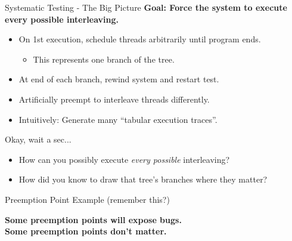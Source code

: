 \documentclass[xcolor=dvipsnames]{beamer}
\begin{document}

\begin{frame}{Systematic Testing - The Big Picture}
	\textbf{Goal: Force the system to execute every possible interleaving.}
	\begin{itemize}
		\item On 1st execution, schedule threads arbitrarily until program ends.
			\begin{itemize}
				\item This represents one branch of the tree.
			\end{itemize}
		\item At end of each branch, rewind system and restart test.
		\item Artificially preempt to interleave threads differently.
		\item Intuitively: Generate many ``tabular execution traces''.
	\end{itemize}
	\pause
	\linegap

	Okay, wait a sec...
	\begin{itemize}
		\item How can you possibly execute {\em every possible} interleaving?
		\item How did you know to draw that tree's branches where they matter?
	\end{itemize}
\end{frame}

\begin{frame}{Preemption Point Example (remember this?)}
	\linegap

	{\bf Some preemption points will expose bugs. \\
	Some preemption points don't matter.}

\end{frame}
\end{document}

